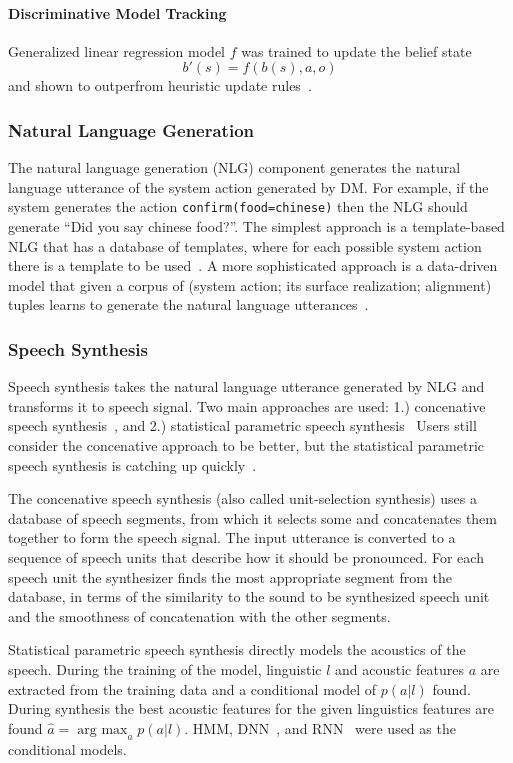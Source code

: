 \documentclass[10pt,twocolumn]{article}
\begin{document}
\paragraph*{Discriminative Model Tracking}
Generalized linear regression model $f$ was trained to update the belief state
$$b'(s)=f(b(s), a, o)$$
and shown to outperfrom heuristic update rules~\cite{bohus2006k}.

\subsubsection{Natural Language Generation}
The natural language generation (NLG) component generates the natural language utterance of the system action generated by DM. For example, if the system generates the action \texttt{confirm(food=chinese)} then the NLG should generate ``Did you say chinese food?''. The simplest approach is a template-based NLG that has a database of templates, where for each possible system action there is a template to be used~\cite{duvsek2014alex}. A more sophisticated approach is a data-driven model that given a corpus of (system action; its surface realization; alignment) tuples learns to generate the natural language utterances~\cite{mairesse2010phrase}.

\subsubsection{Speech Synthesis}
Speech synthesis takes the natural language utterance generated by NLG and transforms it to speech signal. Two main approaches are used: 1.) concenative speech synthesis~\cite{campbell1997prosody,masuko1996speech}, and 2.) statistical parametric speech synthesis~\cite{zen2009statistical} Users still consider the concenative approach to be better, but the statistical parametric speech synthesis is catching up quickly~\cite{zen2009statistical}.

The concenative speech synthesis (also called unit-selection synthesis) uses a database of speech segments, from which it selects some and concatenates them together to form the speech signal. The input utterance is converted to a sequence of speech units that describe how it should be pronounced. For each speech unit the synthesizer finds the most appropriate segment from the database, in terms of the similarity to the sound to be synthesized speech unit and the smoothness of concatenation with the other segments.

Statistical parametric speech synthesis directly models the acoustics of the speech. During the training of the model, linguistic $l$ and acoustic features $a$ are extracted from the training data and a conditional model of $p(a|l)$ found. During synthesis the best acoustic features for the given linguistics features are found $\hat{a}=\operatorname{arg~max}_a p(a|l)$. HMM\cite{yoshimuray1999simultaneous}, DNN~\cite{ze2013statistical}, and RNN~\cite{zen2015unidirectional} were used as the conditional models.
\end{document}
